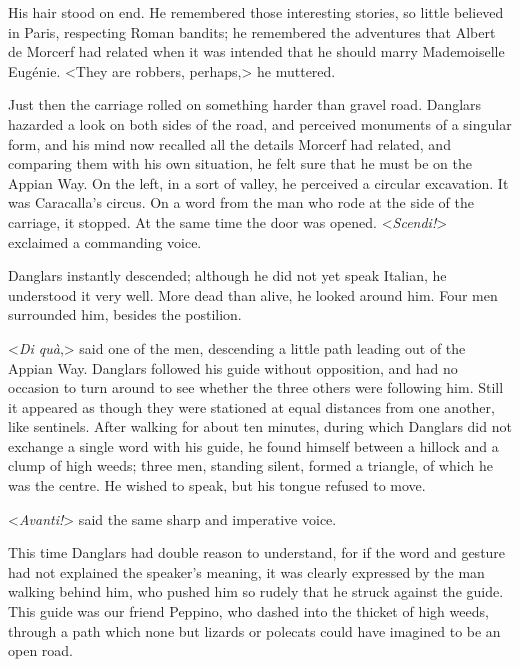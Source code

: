  His hair stood on end. He remembered those interesting stories, so little believed in Paris, respecting Roman bandits; he remembered the adventures that Albert de Morcerf had related when it was intended that he should marry Mademoiselle Eugénie. <They are robbers, perhaps,> he muttered. 

 Just then the carriage rolled on something harder than gravel road. Danglars hazarded a look on both sides of the road, and perceived monuments of a singular form, and his mind now recalled all the details Morcerf had related, and comparing them with his own situation, he felt sure that he must be on the Appian Way. On the left, in a sort of valley, he perceived a circular excavation. It was Caracalla's circus. On a word from the man who rode at the side of the carriage, it stopped. At the same time the door was opened. <\textit{Scendi!}> exclaimed a commanding voice. 

 Danglars instantly descended; although he did not yet speak Italian, he understood it very well. More dead than alive, he looked around him. Four men surrounded him, besides the postilion. 

 <\textit{Di quà},> said one of the men, descending a little path leading out of the Appian Way. Danglars followed his guide without opposition, and had no occasion to turn around to see whether the three others were following him. Still it appeared as though they were stationed at equal distances from one another, like sentinels. After walking for about ten minutes, during which Danglars did not exchange a single word with his guide, he found himself between a hillock and a clump of high weeds; three men, standing silent, formed a triangle, of which he was the centre. He wished to speak, but his tongue refused to move. 

 <\textit{Avanti!}> said the same sharp and imperative voice. 

 This time Danglars had double reason to understand, for if the word and gesture had not explained the speaker's meaning, it was clearly expressed by the man walking behind him, who pushed him so rudely that he struck against the guide. This guide was our friend Peppino, who dashed into the thicket of high weeds, through a path which none but lizards or polecats could have imagined to be an open road. 


